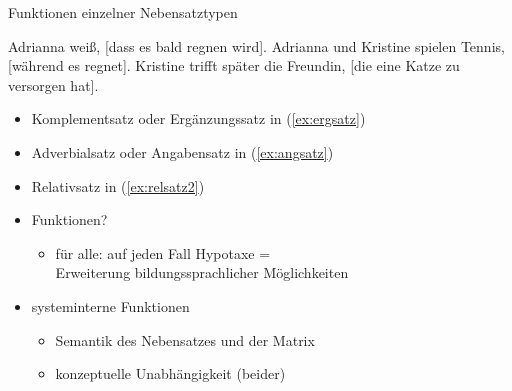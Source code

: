 \begin{frame}
  {Funktionen einzelner Nebensatztypen}
  \pause
  \begin{exe}
    \ex Adrianna weiß, [\alert{dass es bald regnen wird}].\label{ex:ergsatz}
    \pause
    \ex Adrianna und Kristine spielen Tennis, [\alert{während es regnet}].\label{ex:angsatz}
    \pause
    \ex Kristine trifft später die Freundin, [\alert{die eine Katze zu versorgen hat}].\label{ex:relsatz2}
  \end{exe}
  \Halbzeile
  \begin{itemize}[<+->]
    \item \alert{Komplementsatz} oder \alert{Ergänzungssatz} in (\ref{ex:ergsatz})
    \item \alert{Adverbialsatz} oder \alert{Angabensatz} in (\ref{ex:angsatz})
    \item \alert{Relativsatz} in (\ref{ex:relsatz2})
    \item Funktionen?
      \begin{itemize}[<+->]
        \item für alle: auf jeden Fall \alert{Hypotaxe =\\
          Erweiterung bildungssprachlicher Möglichkeiten}
      \end{itemize}
    \item systeminterne Funktionen
      \begin{itemize}[<+->]
        \item Semantik des Nebensatzes und der Matrix
        \item konzeptuelle Unabhängigkeit (beider)
      \end{itemize}
  \end{itemize}
\end{frame}

